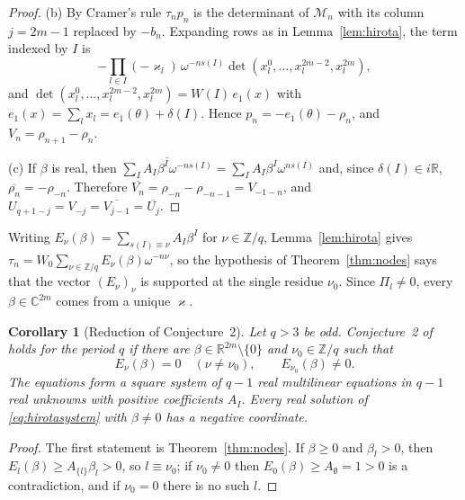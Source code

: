 \documentclass[11pt,reqno]{amsart}
\newtheorem{corollary}[theorem]{Corollary}
\theoremstyle{definition}
\theoremstyle{remark}
\newcommand{\C}{\mathbb C}
\newcommand{\Z}{\mathbb Z}
\newcommand{\R}{\mathbb R}
\begin{document}
\begin{proof}
(b) By Cramer's rule $\tau_np_n$ is the determinant of $\mathcal M_n$ with its column
$j=2m-1$ replaced by $-b_n$.  Expanding rows as in Lemma~\ref{lem:hirota}, the
term indexed by $I$ is
\[
 -\prod_{l\in I}(-\varkappa_l)\,\omega^{-ns(I)}\det(x_l^0,\dots,x_l^{2m-2},x_l^{2m}),
\]
and $\det(x_l^0,\dots,x_l^{2m-2},x_l^{2m})=W(I)\,e_1(x)$ with
$e_1(x)=\sum_lx_l=e_1(\theta)+\delta(I)$.  Hence
$p_n=-e_1(\theta)-\rho_n$, and $V_n=\rho_{n+1}-\rho_n$.

(c) If $\beta$ is real, then $\overline{\sum_IA_I\beta^I\omega^{-ns(I)}}=\sum_IA_I\beta^I\omega^{ns(I)}$
and, since $\delta(I)\in i\R$, $\overline{\rho_n}=-\rho_{-n}$.  Therefore
$\overline{V_n}=\rho_{-n}-\rho_{-n-1}=V_{-1-n}$, and $U_{q+1-j}=V_{-j}=\overline{V_{j-1}}=\overline{U_j}$.
\end{proof}

Writing $E_\nu(\beta)=\sum_{s(I)\equiv\nu}A_I\beta^I$ for $\nu\in\Z/q$,
Lemma~\ref{lem:hirota} gives
$\tau_n=W_0\sum_{\nu\in\Z/q}E_\nu(\beta)\omega^{-n\nu}$, so the hypothesis of
Theorem~\ref{thm:nodes} says that the vector $(E_\nu)_\nu$ is supported at the
single residue $\nu_0$.  Since $\Pi_l\ne0$, every $\beta\in\C^{2m}$ comes from a
unique $\varkappa$.

\begin{corollary}[Reduction of Conjecture~2]\label{cor:nodes}
Let $q>3$ be odd.  Conjecture~2 of~\cite{FFORS2026} holds for the period $q$
if there are $\beta\in\R^{2m}\setminus\{0\}$ and $\nu_0\in\Z/q$ such that
\begin{equation}\label{eq:hirotasystem}
 E_\nu(\beta)=0\quad(\nu\ne\nu_0),\qquad E_{\nu_0}(\beta)\ne0 .
\end{equation}
The equations form a square system of $q-1$ real multilinear equations in
$q-1$ real unknowns with positive coefficients $A_I$.  Every real solution of
\eqref{eq:hirotasystem} with $\beta\ne0$ has a negative coordinate.
\end{corollary}

\begin{proof}
The first statement is Theorem~\ref{thm:nodes}.  If $\beta\ge0$ and
$\beta_l>0$, then $E_l(\beta)\ge A_{\{l\}}\beta_l>0$, so $l\equiv\nu_0$; if
$\nu_0\ne0$ then $E_0(\beta)\ge A_\emptyset=1>0$ is a contradiction, and if
$\nu_0=0$ there is no such $l$.
\end{proof}
\end{document}
